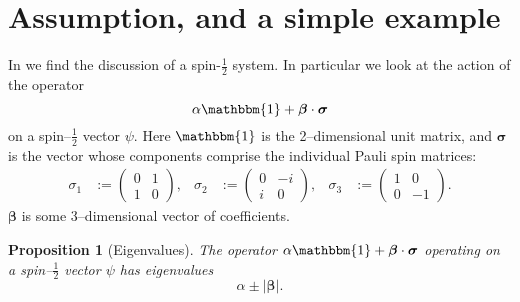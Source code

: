 \documentclass[12pt]{article}
\newtheorem{prop}[thm]{Proposition}
\begin{document}
\section{Assumption, and a simple example}

In \cite[p.448]{Bell1966} we find the discussion of a spin-$\frac{1}{2}$ system. In particular we look at the action of the operator
\begin{displaymath}
  \alpha \mathbbm{1} + \bm{\beta} \cdot \bm{\sigma}
\end{displaymath}
on a spin--$\frac{1}{2}$ vector $\psi$. Here $\mathbbm{1}$ is the 2--dimensional unit matrix, and $\bm{\sigma}$ is the vector whose components comprise the individual Pauli spin matrices:
\begin{align*}
  \sigma_1 &:= \begin{pmatrix}
                 0 & 1 \\
                 1 & 0
               \end{pmatrix},
              &
  \sigma_2 &:= \begin{pmatrix}
                 0 & -i \\
                 i & 0
               \end{pmatrix},
              &
  \sigma_3 &:= \begin{pmatrix}
                 1 & 0 \\
                 0 & -1
               \end{pmatrix}.
\end{align*}
$\bm{\beta}$ is some 3--dimensional vector of coefficients.

\begin{prop}[Eigenvalues]
  The operator $\alpha \mathbbm{1} + \bm{\beta} \cdot \bm{\sigma}$ operating on a spin--$\frac{1}{2}$ vector $\psi$ has eigenvalues
  \begin{displaymath}
    \alpha \pm |\bm{\beta}|.
  \end{displaymath}
\end{prop}
\end{document}

